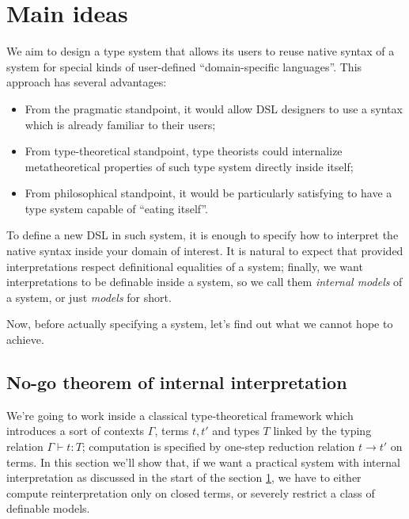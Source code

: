 \section{Main ideas}\label{main-ideas}

We aim to design a type system that allows its users to
reuse native syntax of a system for special kinds of
user-defined ``domain-specific languages''. This
approach has several advantages:

\begin{itemize}
    \item From the pragmatic standpoint, it would allow
        DSL designers to use a syntax which is already
        familiar to their users;
    \item From type-theoretical standpoint, type
        theorists could internalize metatheoretical
        properties of such type system directly inside
        itself;
    \item From philosophical standpoint, it would be
        particularly satisfying to have a type system
        capable of ``eating itself''.
\end{itemize}

To define a new DSL in such system, it is enough to
specify how to interpret the native syntax inside your
domain of interest. It is natural to expect that
provided interpretations respect definitional equalities
of a system; finally, we want interpretations to be
definable inside a system, so we call them
\textit{internal models} of a system, or just
\textit{models} for short.

Now, before actually specifying a system, let's find out
what we cannot hope to achieve.

\subsection{No-go theorem of internal interpretation}
\label{no-go-section}

We're going to work inside a classical type-theoretical
framework which introduces a sort of contexts $\Gamma$,
terms $t,t'$ and types $T$ linked by the typing relation
$\Gamma\vdash t:T$; computation is specified by one-step
reduction relation $t\to t'$ on terms. In this section
we'll show that, if we want a practical system with
internal interpretation as discussed in the start of the
section \ref{main-ideas}, we have to either compute
reinterpretation only on closed terms, or severely
restrict a class of definable models.

